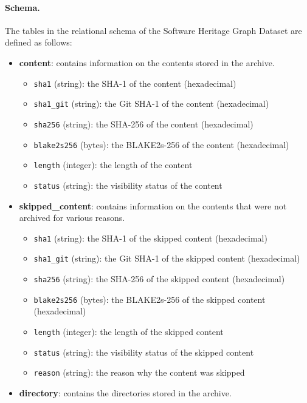 \paragraph*{Schema.}
The tables in the relational schema of the Software Heritage Graph Dataset are
defined as follows:


\begin{itemize}
\item
  \textbf{content}: contains information on the contents stored in the
  archive.

  \begin{itemize}
  \tightlist
  \item
    \texttt{sha1} (string): the SHA-1 of the content (hexadecimal)
  \item
    \texttt{sha1\_git} (string): the Git SHA-1 of the content
    (hexadecimal)
  \item
    \texttt{sha256} (string): the SHA-256 of the content (hexadecimal)
  \item
    \texttt{blake2s256} (bytes): the BLAKE2s-256 of the content
    (hexadecimal)
  \item
    \texttt{length} (integer): the length of the content
  \item
    \texttt{status} (string): the visibility status of the content
  \end{itemize}
\item
  \textbf{skipped\_content}: contains information on the contents that
  were not archived for various reasons.

  \begin{itemize}
  \tightlist
  \item
    \texttt{sha1} (string): the SHA-1 of the skipped content
    (hexadecimal)
  \item
    \texttt{sha1\_git} (string): the Git SHA-1 of the skipped content
    (hexadecimal)
  \item
    \texttt{sha256} (string): the SHA-256 of the skipped content
    (hexadecimal)
  \item
    \texttt{blake2s256} (bytes): the BLAKE2s-256 of the skipped content
    (hexadecimal)
  \item
    \texttt{length} (integer): the length of the skipped content
  \item
    \texttt{status} (string): the visibility status of the skipped
    content
  \item
    \texttt{reason} (string): the reason why the content was skipped
  \end{itemize}
\item
  \textbf{directory}: contains the directories stored in the archive.


\end{itemize}
